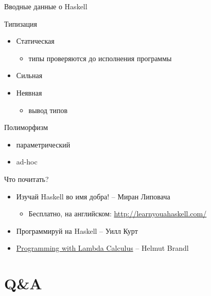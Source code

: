 \documentclass{beamer}
\begin{document}
  \begin{frame}{Вводные данные о Haskell}
      \begin{block}{Типизация}
          \begin{itemize}
              \item Статическая
                \begin{itemize}
                    \item типы проверяются до исполнения программы
                \end{itemize}
              \item Сильная
              \item Неявная
                \begin{itemize}
                    \item вывод типов
                \end{itemize}
          \end{itemize}
      \end{block}
      \begin{block}{Полиморфизм}
        \begin{itemize}
            \item параметрический
            \item ad-hoc
        \end{itemize}
      \end{block}
  \end{frame}
  \begin{frame}{Что почитать?}
      \begin{itemize}
          \item Изучай Haskell во имя добра! -- Миран Липовача
          \begin{itemize}
              \item Бесплатно, на английском: \url{http://learnyouahaskell.com/}
          \end{itemize}
          \item Программируй на Haskell -- Уилл Курт
      \end{itemize}
      \begin{itemize}
          \item \alert{\href{https://hbr.github.io/Lambda-Calculus/lambda2/lambda.html}{Programming with Lambda Calculus}} -- Helmut Brandl
      \end{itemize}
  \end{frame}
  \section{Q\&A}
\end{document}
